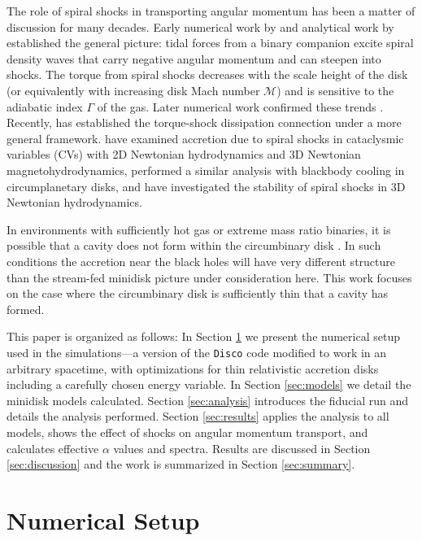 \documentclass{emulateapj}
\newcommand{\Disco}{{\texttt{Disco}}}
\begin{document}
The role of spiral shocks in transporting angular momentum has been a matter of discussion for many decades.  Early numerical work by \cite{Sawada86} and analytical work by \cite{Spruit87} established the general picture: tidal forces from a binary companion excite spiral density waves that carry negative angular momentum and can steepen into shocks.  The torque from spiral shocks decreases with the scale height of the disk (or equivalently with increasing disk Mach number $\mathcal{M}$) and is sensitive to the adiabatic index $\Gamma$ of the gas.  Later numerical work confirmed these trends \citep{Godon98, Blondin00}.  Recently, \cite{Rafikov16} has established the torque-shock dissipation connection under a more general framework.  \cite{Ju16} have examined accretion due to spiral shocks in cataclysmic variables (CVs) with 2D Newtonian hydrodynamics and 3D Newtonian magnetohydrodynamics, \cite{Zhu16} performed a similar analysis with blackbody cooling in circumplanetary disks, and \cite{Bae16} have investigated the stability of spiral shocks in 3D Newtonian hydrodynamics.

In environments with sufficiently hot gas or extreme mass ratio binaries, it is possible that a cavity does not form within the circumbinary disk \citep{delValle14,delValle15}. In such conditions the accretion near the black holes will have very different structure than the stream-fed minidisk picture under consideration here. This work focuses on the case where the circumbinary disk is sufficiently thin that a cavity has formed.

This paper is organized as follows: In Section \ref{sec:numerics} we present the
numerical setup used in the simulations---a version of the \Disco{} code 
modified to work in an arbitrary spacetime, with optimizations for thin 
relativistic accretion disks including a carefully chosen energy variable.  In Section \ref{sec:models} we detail the 
minidisk models calculated.  Section \ref{sec:analysis} introduces the fiducial run and details the analysis performed.  Section \ref{sec:results} applies the analysis to all models, shows the effect of shocks on angular momentum transport, and calculates effective $\alpha$ values and spectra. Results are discussed in Section \ref{sec:discussion} and the work is summarized in Section \ref{sec:summary}.



\section{Numerical Setup}
\label{sec:numerics}
\end{document}
